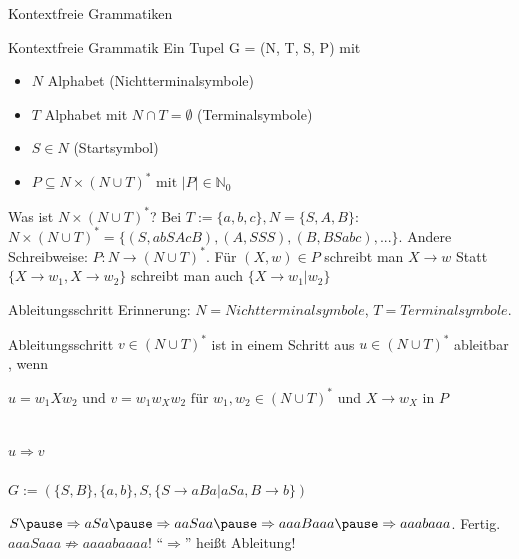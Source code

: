 \documentclass[handout]{beamer}
\begin{document}
\begin{frame}{Kontextfreie Grammatiken}
	\begin{block}{Kontextfreie Grammatik}
		Ein Tupel G = (N, T, S, P) mit
		\begin{itemize}
			\item $N$ Alphabet (Nichtterminalsymbole)
			\item $T$ Alphabet mit $N \cap T = \emptyset$ (Terminalsymbole)
			\item $S \in N$ (Startsymbol)
			\item $P \subseteq N \times (N \cup T)^* \text{ mit } |P| \in \mathbb{N}_0$
		\end{itemize}
	\end{block}

	\begin{itemize}
		\pitem Was ist $N \times (N \cup T)^*$? Bei $T := \{a,b,c\}, N = \{S, A, B\}$\ip : $N \times (N \cup T)^* = \{(S, abSAcB), (A, SSS), (B, BSabc), ...\}$.
		\pitem Andere Schreibweise: $P : N \rightarrow (N \cup T)^*$.
		\pitem Für $(X, w) \in P$ schreibt man $X \rightarrow w$
		\pitem Statt $\{X\rightarrow w_1, X \rightarrow w_2 \}$ schreibt man auch $\{X \rightarrow w_1 | w_2\}$
	\end{itemize}
	
\end{frame}

\begin{frame}{Ableitungsschritt}
	Erinnerung: $N = Nichtterminalsymbole$, $T = Terminalsymbole$. \pause
	
	\begin{block}{Ableitungsschritt}
		$v \in (N \cup T)^*$ ist in einem Schritt aus $u \in (N \cup T)^*$ ableitbar , wenn 
		\begin{itemize}
			\pitem $u = w_1 X w_2 \text{ und } v = w_1 w_X w_2 \text{ für } w_1, w_2 \in (N \cup T)^* $
			\pitem und $X \rightarrow w_X$ in $P$
		\end{itemize}
	\end{block}

	\bp{}\\
	$u\Rightarrow v$\\
	\bp{}\\
	$G:= (\{S,B\}, \{a,b\}, S, \{S \rightarrow aBa|aSa, B \rightarrow b\})$
	
	\begin{itemize}
		\pitem $S \ip\Rightarrow aSa \ip\Rightarrow aaSaa \ip\Rightarrow aaaBaaa \ip\Rightarrow aaabaaa$. \ip Fertig.
		\pitem $aaaSaaa \not\Rightarrow aaaabaaaa$! 
		\pitem ``$\Rightarrow$'' heißt  Ableitung!
	\end{itemize}
\end{frame}
\end{document}
